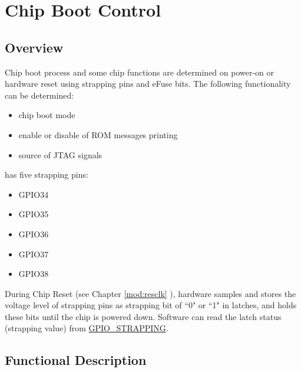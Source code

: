 \documentclass[main\_\_EN.tex]{subfiles}
\begin{document}

\ifglobal
\else
    {\let\clearpage\relax \listoftodos}
    {\let\clearpage\relax \listofdonetodos}
    \tableofcontents
\fi



\hypertarget{bootctrl}{}
\chapter{Chip Boot Control}
\label{mod:bootctrl}


\section{Overview}

Chip boot process and some chip functions are determined on power-on or hardware reset using strapping pins and eFuse bits. The following functionality can be determined:
\begin{itemize}
    \item chip boot mode
    \item enable or disable of ROM messages printing
    \item source of JTAG signals

\end{itemize}

\chipname{} has five strapping pins:
\begin{itemize}
    \item GPIO34
    \item GPIO35
    \item GPIO36
    \item GPIO37
    \item GPIO38
\end{itemize}

During Chip Reset (see Chapter \ref{mod:resclk} \textit{}), hardware samples and stores the voltage level of strapping pins as strapping bit of ``0" or ``1" in latches, and holds these bits until the chip is powered down. Software can read the latch status (strapping value) from \hyperref[fielddesc:GPIOSTRAPPING]{GPIO\_STRAPPING}.

\section{Functional Description}
\end{document}
